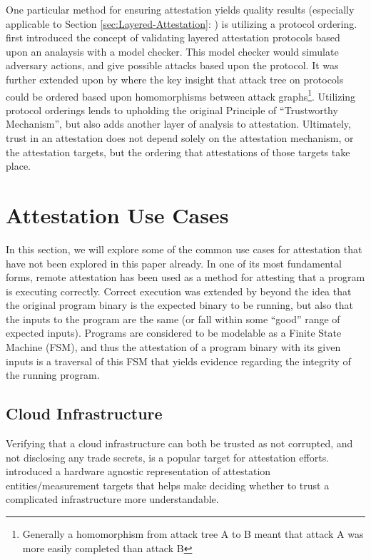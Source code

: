 \documentclass[acmsmall]{acmart}
\theoremstyle{definition}
\newcommand{\secref}[1]{Section \ref{#1}: \nameref{#1}}
\begin{document}
One particular method for ensuring attestation yields quality results
(especially applicable to \secref{sec:Layered-Attestation}) is 
utilizing a protocol ordering.
\citet{Ramsdell:09:An-Analysis-of-,Ramsdell:2020:Chase} first introduced
the concept of validating layered attestation protocols based upon an
analaysis with a model checker. This model checker would simulate
adversary actions, and give possible attacks based upon the protocol.
It was further extended upon by \citet{rowe2021orderings,Rowe:2016wb} where
the key insight that attack tree on protocols could be ordered
based upon homomorphisms between attack graphs\footnote{Generally a homomorphism from attack tree A to B meant that attack A was more easily completed than attack B}.
Utilizing protocol orderings lends to upholding the original Principle of ``Trustworthy Mechanism'', but also adds another layer of analysis to attestation.
Ultimately, trust in an attestation does not depend solely on the attestation
mechanism, or the attestation targets, but the ordering that attestations
of those targets take place.

\section{Attestation Use Cases}

In this section, we will explore some of the common use cases for attestation 
that have not been explored in this paper already.
In one of its most fundamental forms, remote attestation has been used as a method for attesting that a program is executing correctly.
Correct execution was extended by \citet{Gu:2008:Remote-Attestation-on-Program-Execution} beyond the idea that the original program binary is the expected binary to be running, but also that the inputs to the program are the same (or fall within some ``good'' range of expected inputs). Programs are considered to be modelable as a Finite State Machine (FSM), and thus the attestation of a program binary with its given inputs is a traversal of this FSM that yields evidence regarding the integrity of the running program. 

\subsection{Cloud Infrastructure}

Verifying that a cloud infrastructure can both be trusted 
as not corrupted, and not disclosing any trade secrets, is a 
popular target for attestation efforts.
\citet{Ott:2023:Universal-Remote-Attestation-Cloud-Platforms} introduced
a hardware agnostic representation of attestation entities/measurement targets that helps make deciding whether to trust a complicated infrastructure more understandable.
\end{document}
